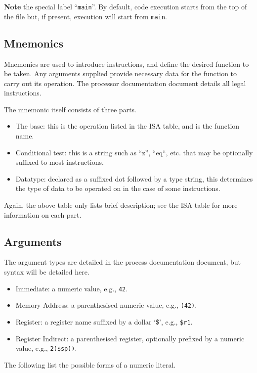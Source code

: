 \documentclass{article}
\begin{document}
\textbf{Note} the special label ``\texttt{main}''.
By default, code execution starts from the top of the file but, if present, execution will start from \texttt{main}.

\subsection{Mnemonics}

Mnemonics are used to introduce instructions, and define the desired function to be taken.
Any arguments supplied provide necessary data for the function to carry out its operation.
The processor documentation document details all legal instructions.

The mnemonic itself consists of three parts.
\begin{itemize}
    \item The base: this is the operation listed in the ISA table, and is the function name.
    \item Conditional test: this is a string such as ``z'', ``eq``, etc. that may be optionally suffixed to most instructions.
    \item Datatype: declared as a suffixed dot followed by a type string, this determines the type of data to be operated on in the case of some instructions.
\end{itemize}

Again, the above table only lists brief description; see the ISA table for more information on each part.

\subsection{Arguments}

The argument types are detailed in the process documentation document, but syntax will be detailed here.
\begin{itemize}
    \item Immediate: a numeric value, e.g., \texttt{42}.
    \item Memory Address: a parenthesised numeric value, e.g., \texttt{(42)}.
    \item Register: a register name suffixed by a dollar `\$', e.g., \texttt{\$r1}.
    \item Register Indirect: a parenthesised register, optionally prefixed by a numeric value, e.g., \texttt{2(\$sp))}.
\end{itemize}

The following list the possible forms of a numeric literal.
\end{document}
